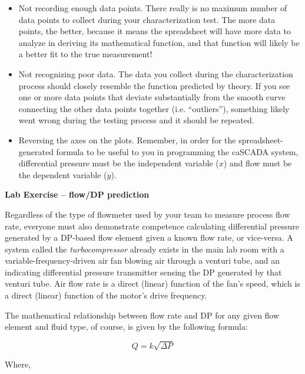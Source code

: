 \begin{itemize}
\item{} Not recording enough data points.  There really is no maximum number of data points to collect during your characterization test.  The more data points, the better, because it means the spreadsheet will have more data to analyze in deriving its mathematical function, and that function will likely be a better fit to the true measurement!
\item{} Not recognizing poor data.  The data you collect during the characterization process should closely resemble the function predicted by theory.  If you see one or more data points that deviate substantially from the smooth curve connecting the other data points together (i.e. ``outliers''), something likely went wrong during the testing process and it should be repeated.
\item{} Reversing the axes on the plots.  Remember, in order for the spreadsheet-generated formula to be useful to you in programming the caSCADA system, differential pressure must be the independent variable ($x$) and flow must be the dependent variable ($y$).
\end{itemize}









\vfil \eject

\noindent
{\bf Lab Exercise -- flow/DP prediction}

\vskip 5pt

Regardless of the type of flowmeter used by your team to measure process flow rate, everyone must also demonstrate competence calculating differential pressure generated by a DP-based flow element given a known flow rate, or vice-versa.  A system called the {\it turbocompressor} already exists in the main lab room with a variable-frequency-driven air fan blowing air through a venturi tube, and an indicating differential pressure transmitter sensing the DP generated by that venturi tube.  Air flow rate is a direct (linear) function of the fan's speed, which is a direct (linear) function of the motor's drive frequency.

\vskip 10pt

The mathematical relationship between flow rate and DP for any given flow element and fluid type, of course, is given by the following formula:

$$Q = k \sqrt{\Delta P}$$

\noindent
Where,

